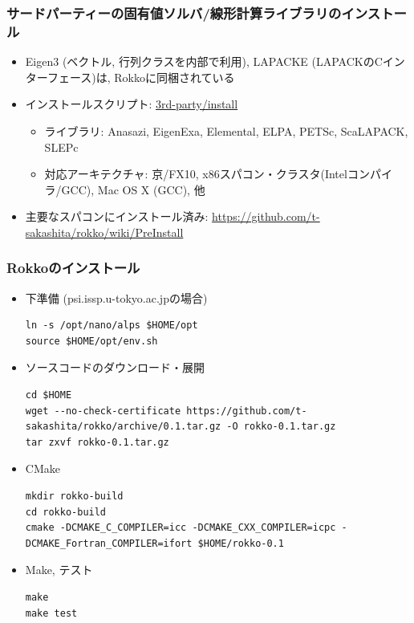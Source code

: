 \begin{frame}
  \frametitle{サードパーティーの固有値ソルバ/線形計算ライブラリのインストール}
  \begin{itemize}
    \setlength{\itemsep}{1em}
  \item Eigen3 (ベクトル, 行列クラスを内部で利用), LAPACKE (LAPACKのCインターフェース)は, Rokkoに同梱されている
  \item インストールスクリプト: \href{https://github.com/t-sakashita/rokko/tree/master/3rd-party/install}{3rd-party/install}
    \begin{itemize}
      \item ライブラリ: Anasazi, EigenExa, Elemental, ELPA, PETSc, ScaLAPACK, SLEPc
      \item 対応アーキテクチャ: 京/FX10, x86スパコン・クラスタ(Intelコンパイラ/GCC), Mac OS X (GCC), 他
    \end{itemize}
  \item 主要なスパコンにインストール済み: \url{https://github.com/t-sakashita/rokko/wiki/PreInstall}
  \end{itemize}
\end{frame}

\begin{frame}[c,fragile]
  \frametitle{Rokkoのインストール}
  \begin{itemize}
  \item 下準備 (psi.issp.u-tokyo.ac.jpの場合)
\begin{lstlisting}
ln -s /opt/nano/alps $HOME/opt
source $HOME/opt/env.sh
\end{lstlisting}
  \item ソースコードのダウンロード・展開
\begin{lstlisting}
cd $HOME
wget --no-check-certificate https://github.com/t-sakashita/rokko/archive/0.1.tar.gz -O rokko-0.1.tar.gz
tar zxvf rokko-0.1.tar.gz
\end{lstlisting}
  \item CMake
\begin{lstlisting}
mkdir rokko-build
cd rokko-build
cmake -DCMAKE_C_COMPILER=icc -DCMAKE_CXX_COMPILER=icpc -DCMAKE_Fortran_COMPILER=ifort $HOME/rokko-0.1
\end{lstlisting}
  \item Make, テスト
\begin{lstlisting}
make
make test
\end{lstlisting}
  \end{itemize}
\end{frame}

